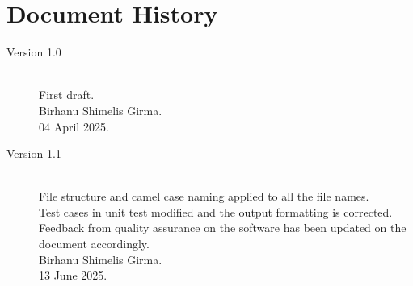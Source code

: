 \documentclass{CSSRforAfrica}
\begin{document}
\newpage
\section*{Document History}
\label{document_history}

\begin{description}

\item [Version 1.0]~\\
First draft. \\
Birhanu Shimelis Girma. \\
04 April 2025.

\item [Version 1.1]~\\
File structure and camel case naming applied to all the file names. \\
Test cases in unit test modified and the output formatting is corrected. \\
Feedback from quality assurance on the software has been updated on the document accordingly.  \\
Birhanu Shimelis Girma. \\
13 June 2025.

\end{description}
\end{document}
